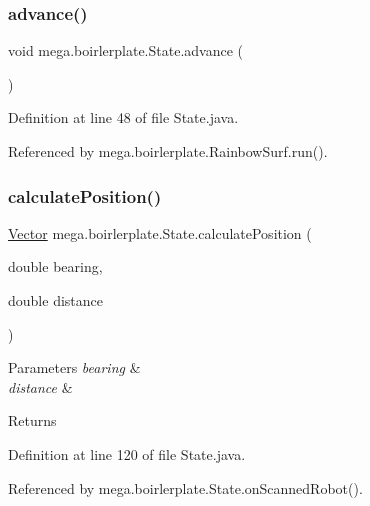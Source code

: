 \subsubsection{\texorpdfstring{advance()}{advance()}}
{\footnotesize\ttfamily void mega.\+boirlerplate.\+State.\+advance (\begin{DoxyParamCaption}{ }\end{DoxyParamCaption})}



Definition at line 48 of file State.\+java.



Referenced by mega.\+boirlerplate.\+Rainbow\+Surf.\+run().

\mbox{\label{classmega_1_1boirlerplate_1_1_state_a5701db7eabb0dd0edf293082879f4880}} 
\subsubsection{\texorpdfstring{calculate\+Position()}{calculatePosition()}}
{\footnotesize\ttfamily \hyperlink{classmega_1_1boirlerplate_1_1_vector}{Vector} mega.\+boirlerplate.\+State.\+calculate\+Position (\begin{DoxyParamCaption}\item[{double}]{bearing,  }\item[{double}]{distance }\end{DoxyParamCaption})\hspace{0.3cm}{\ttfamily [private]}}


\begin{DoxyParams}{Parameters}
{\em bearing} & \\
\hline
{\em distance} & \\
\hline
\end{DoxyParams}
\begin{DoxyReturn}{Returns}

\end{DoxyReturn}


Definition at line 120 of file State.\+java.



Referenced by mega.\+boirlerplate.\+State.\+on\+Scanned\+Robot().

\mbox{\label{classmega_1_1boirlerplate_1_1_state_aa70df138d69de469048d7071125fb261}} 
